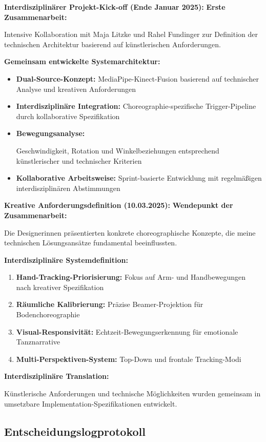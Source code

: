 \textbf{Interdisziplinärer Projekt-Kick-off (Ende Januar 2025):}
\textbf{Erste Zusammenarbeit:} \raggedright Intensive Kollaboration mit Maja Litzke und Rahel Fundinger zur Definition der technischen Architektur basierend auf künstlerischen Anforderungen.

\textbf{Gemeinsam entwickelte Systemarchitektur:}
\begin{itemize}
    \item \textbf{Dual-Source-Konzept:} MediaPipe-Kinect-Fusion basierend auf technischer Analyse und kreativen Anforderungen
    \item \textbf{Interdisziplinäre Integration:} Choreographie-spezifische Trigger-Pipeline durch kollaborative Spezifikation
    \item \textbf{Bewegungsanalyse:} \raggedright Geschwindigkeit, Rotation und Winkelbeziehungen entsprechend künstlerischer und technischer Kriterien
    \item \textbf{Kollaborative Arbeitsweise:} Sprint-basierte Entwicklung mit regelmäßigen interdisziplinären Abstimmungen
\end{itemize}

\textbf{Kreative Anforderungsdefinition (10.03.2025):}
\textbf{Wendepunkt der Zusammenarbeit:} \raggedright Die Designerinnen präsentierten konkrete choreographische Konzepte, die meine technischen Lösungsansätze fundamental beeinflussten.

\textbf{Interdisziplinäre Systemdefinition:}
\begin{enumerate}
    \item \textbf{Hand-Tracking-Priorisierung:} Fokus auf Arm- und Handbewegungen nach kreativer Spezifikation
    \item \textbf{Räumliche Kalibrierung:} Präzise Beamer-Projektion für Bodenchoreographie
    \item \textbf{Visual-Responsivität:} Echtzeit-Bewegungserkennung für emotionale Tanznarrative  
    \item \textbf{Multi-Perspektiven-System:} Top-Down und frontale Tracking-Modi
\end{enumerate}

\textbf{Interdisziplinäre Translation:} \raggedright Künstlerische Anforderungen und technische Möglichkeiten wurden gemeinsam in umsetzbare Implementation-Spezifikationen entwickelt.

\subsection{Entscheidungslogprotokoll}

